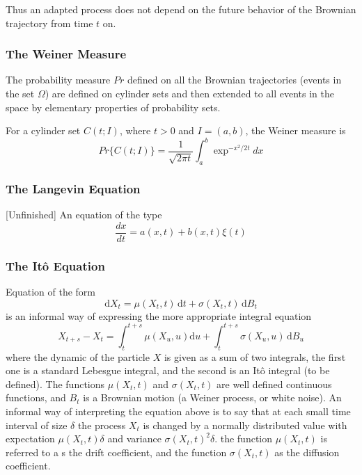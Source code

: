 \documentclass[12pt]{report}
\begin{document}
Thus an adapted process does not depend on the future behavior of the Brownian trajectory from time $t$ on.

\subsubsection{The Weiner Measure}\label{theWeinerMeasure}
The probability measure $Pr$ defined on all the Brownian trajectories (events in the set $\Omega$) are defined on cylinder sets and then extended to all events in the space by elementary properties of probability sets.

For a cylinder set $C(t;I)$, where $t>0$ and $I=(a,b)$, the Weiner measure is 
\begin{equation}
Pr\{C(t;I)\}=\frac{1}{\sqrt{2\pi t}}\int_a^b\exp^{-x^2/2t}dx
\end{equation}

\subsubsection{The Langevin Equation}{[Unfinished]}
An equation of the type 
\begin{equation*}
\frac{dx}{dt}=a(x,t)+b(x,t)\xi(t)
\end{equation*}

\subsubsection{The It\^{o} Equation}
Equation of the form 
\begin{equation*}
 \mathrm{d} X_t = \mu(X_t,t)\, \mathrm{d} t +  \sigma(X_t,t)\, \mathrm{d} B_t
\end{equation*}
is an informal way of expressing the more appropriate integral equation 
\begin{equation*}
X_{t+s} - X_{t} = \int_t^{t+s} \mu(X_u,u) \mathrm{d} u + \int_t^{t+s} \sigma(X_u,u)\, \mathrm{d} B_u
\end{equation*}
where the dynamic of the particle $X$ is given as a sum of two integrals, the first one is a standard Lebesgue integral, and the second is an It\^{o} integral (to be defined).  
The functions $\mu(X_t,t)$ and $\sigma(X_t,t)$ are well defined continuous functions, and $B_t$ is a Brownian motion (a Weiner process, or white noise). An informal way of interpreting the equation above is to say that at each small time interval of size $\delta$ the process $X_t$ is changed by a normally distributed value with expectation $\mu(X_t,t)\delta$ and variance $\sigma(X_t,t)^2\delta$. 
the function $\mu(X_t,t)$ is referred to a s the drift coefficient, and the function $\sigma(X_t,t)$ as the diffusion coefficient. 
\end{document}
